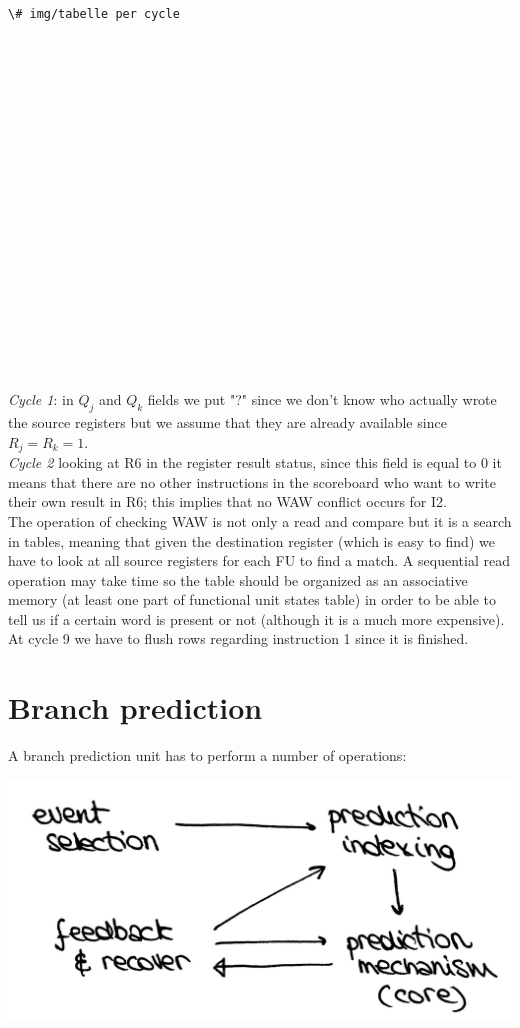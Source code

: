 \begin{verbatim}
\# img/tabelle per cycle



















\end{verbatim}

\textit{Cycle 1}: in $Q_j$ and $Q_k$ fields we put "?" since we don't know who actually wrote the source registers but we assume that they are already available since $R_j=R_k=1$.\\

\textit{Cycle 2} looking at R6 in the register result status, since this field is equal to 0 it means that there are no other instructions in the scoreboard who want to write their own result in R6; this implies that no WAW conflict occurs for I2.\\

The operation of checking WAW is not only a read and compare but it is a search in tables, meaning that given the destination register (which is easy to find) we have to look at all source registers for each FU to find a match. A sequential read operation may take time so the table should be organized as an associative memory (at least one part of functional unit states table) in order to be able to tell us if a certain word is present or not (although it is a much more expensive).\\

At cycle 9 we have to flush rows regarding instruction 1 since it is finished.

\section{Branch prediction}

A branch prediction unit has to perform a number of operations:

\begin{center}
  \includegraphics[width=0.55\linewidth]{img/img3/12}
\end{center}

